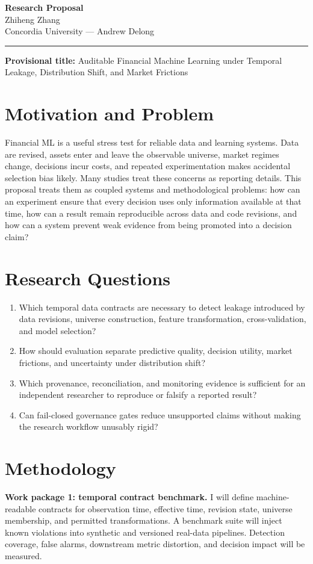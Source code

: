 \documentclass[11pt]{article}
\newcommand{\ApplicantName}{Zhiheng Zhang}
\begin{document}
\begin{center}
{\LARGE\bfseries Research Proposal}\\[0.25em]
{\large \ApplicantName}\\
Concordia University --- Andrew Delong
\end{center}
\vspace{0.35em}\hrule\vspace{0.65em}

\textbf{Provisional title:} Auditable Financial Machine Learning under Temporal Leakage, Distribution Shift, and Market Frictions

\section*{Motivation and Problem}
Financial ML is a useful stress test for reliable data and learning systems. Data are revised, assets enter and leave the observable universe, market regimes change, decisions incur costs, and repeated experimentation makes accidental selection bias likely. Many studies treat these concerns as reporting details. This proposal treats them as coupled systems and methodological problems: how can an experiment ensure that every decision uses only information available at that time, how can a result remain reproducible across data and code revisions, and how can a system prevent weak evidence from being promoted into a decision claim?

\section*{Research Questions}
\begin{enumerate}
\item Which temporal data contracts are necessary to detect leakage introduced by data revisions, universe construction, feature transformation, cross-validation, and model selection?
\item How should evaluation separate predictive quality, decision utility, market frictions, and uncertainty under distribution shift?
\item Which provenance, reconciliation, and monitoring evidence is sufficient for an independent researcher to reproduce or falsify a reported result?
\item Can fail-closed governance gates reduce unsupported claims without making the research workflow unusably rigid?
\end{enumerate}

\section*{Methodology}
\textbf{Work package 1: temporal contract benchmark.} I will define machine-readable contracts for observation time, effective time, revision state, universe membership, and permitted transformations. A benchmark suite will inject known violations into synthetic and versioned real-data pipelines. Detection coverage, false alarms, downstream metric distortion, and decision impact will be measured.
\end{document}
